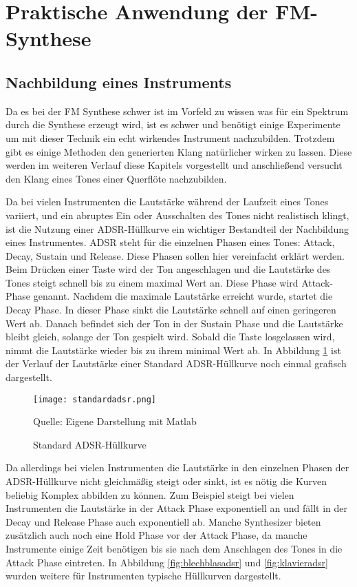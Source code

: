 \section{Praktische Anwendung der FM-Synthese}
\FloatBarrier
\subsection{Nachbildung eines Instruments}
Da es bei der FM Synthese schwer ist im Vorfeld zu wissen was für ein Spektrum durch die Synthese erzeugt wird, ist es schwer und benötigt einige Experimente um mit dieser Technik ein echt wirkendes Instrument nachzubilden.
Trotzdem gibt es einige Methoden den generierten Klang natürlicher wirken zu lassen. Diese werden im weiteren Verlauf diese Kapitels vorgestellt und anschließend versucht den Klang eines Tones einer Querflöte nachzubilden.

Da bei vielen Instrumenten die Lautstärke während der Laufzeit eines Tones variiert, und ein abruptes Ein oder Ausschalten des Tones nicht realistisch klingt, ist die Nutzung einer ADSR-Hüllkurve ein wichtiger Bestandteil der Nachbildung eines Instrumentes. ADSR steht für die einzelnen Phasen eines Tones: Attack, Decay, Sustain und Release. Diese Phasen sollen hier vereinfacht erklärt werden. Beim Drücken einer Taste wird der Ton angeschlagen und die Lautstärke des Tones steigt schnell bis zu einem maximal Wert an. Diese Phase wird Attack-Phase genannt. Nachdem die maximale Lautstärke erreicht wurde, startet die Decay Phase. In dieser Phase sinkt die Lautstärke schnell auf einen geringeren Wert ab. Danach befindet sich der Ton in der Sustain Phase und die Lautstärke bleibt gleich, solange der Ton gespielt wird. Sobald die Taste losgelassen wird, nimmt die Lautstärke wieder bis zu ihrem minimal Wert ab. In Abbildung \ref{fig:defaultADSR} ist der Verlauf der Lautstärke einer Standard ADSR-Hüllkurve noch einmal grafisch dargestellt.

\begin{figure} [ht]
\centering
  \texttt{[image: standardadsr.png]}
\caption{Standard ADSR-Hüllkurve}
\label{fig:defaultADSR}
Quelle: Eigene Darstellung mit Matlab
\end{figure}

Da allerdings bei vielen Instrumenten die Lautstärke in den einzelnen Phasen der ADSR-Hüllkurve nicht gleichmäßig steigt oder sinkt, ist es nötig die Kurven beliebig Komplex abbilden zu können. Zum Beispiel steigt bei vielen Instrumenten die Lautstärke in der Attack Phase exponentiell an und fällt in der Decay und Release Phase auch exponentiell ab. Manche Synthesizer bieten zusätzlich auch noch eine Hold Phase vor der Attack Phase, da manche Instrumente einige Zeit benötigen bis sie nach dem Anschlagen des Tones in die Attack Phase eintreten. In Abbildung \ref{fig:blechblasadsr} und \ref{fig:klavieradsr} wurden weitere für Instrumenten typische Hüllkurven dargestellt.

